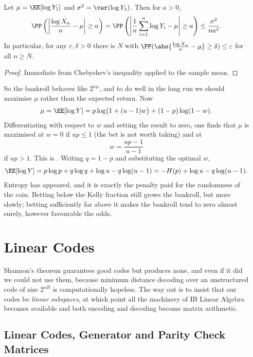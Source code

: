 \begin{lemma}
	Let $\mu = \EE[\log Y_1]$ and $\sigma^2 = \var(\log Y_1)$. Then for $a>0$,
	$$\PP\left(\left\lvert \frac{\log X_n}{n}-\mu\right\rvert \ge a\right) = \PP\left(\left\lvert\frac1n\sum_{i=1}^n \log Y_i - \mu\right\rvert\ge a\right) \le \frac{\sigma^2}{na^2}.$$
	In particular, for any $\varepsilon, \delta>0$ there is $N$ with $\PP(\abs{\frac{\log X_n}{n}-\mu}\ge\delta)\le\varepsilon$ for all $n\ge N$.
\end{lemma}

\begin{proof}
	Immediate from Chebyshev's inequality applied to the sample mean.
\end{proof}

So the bankroll behaves like $2^{n\mu}$, and to do well in the long run we should maximise $\mu$ rather than the expected return. Now
$$\mu = \EE[\log Y] = p\log\bigl(1+(u-1)w\bigr)+(1-p)\log(1-w).$$
Differentiating with respect to $w$ and setting the result to zero, one finds that $\mu$ is maximised at $w = 0$ if $up \le 1$ (the bet is not worth taking) and at
$$w = \frac{up-1}{u-1}$$
if $up>1$. This is . Writing $q = 1-p$ and substituting the optimal $w$,
$$\EE[\log Y] = p\log p + q \log q + \log u - q\log(u-1) = -H(p)+\log u - q\log(u-1).$$
Entropy has appeared, and it is exactly the penalty paid for the randomness of the coin. Betting below the Kelly fraction still grows the bankroll, but more slowly; betting sufficiently far above it makes the bankroll tend to zero almost surely, however favourable the odds.


\section{Linear Codes}\label{sec:linear}

Shannon's theorem guarantees good codes but produces none, and even if it did we could not use them, because minimum distance decoding over an unstructured code of size $2^{nR}$ is computationally hopeless. The way out is to insist that our codes be \emph{linear subspaces}, at which point all the machinery of IB Linear Algebra becomes available and both encoding and decoding become matrix arithmetic.

\subsection{Linear Codes, Generator and Parity Check Matrices}

